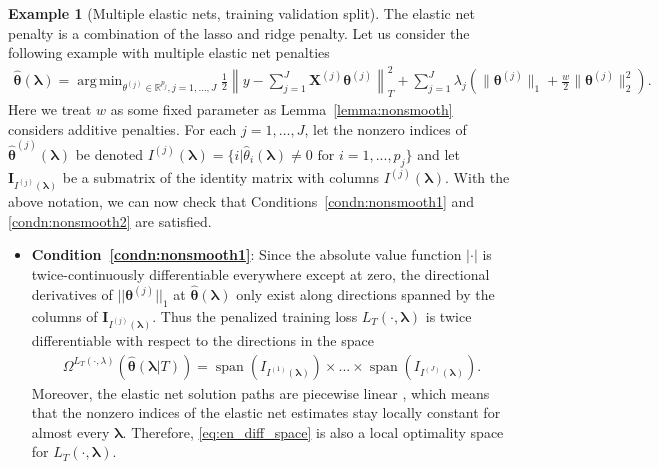 \documentclass[12pt]{article} %
\theoremstyle{definition}
\newtheorem{example}{Example}
\DeclareMathOperator{\spann}{span}
\DeclareMathOperator*{\argmin}{arg\,min}
\begin{document}
\begin{example}[Multiple elastic nets, training validation split]
	\label{ex:elastic_net_tv}
	The elastic net penalty is a combination of the lasso and ridge penalty.
	Let us consider the following example with multiple elastic net penalties
	\begin{align}
	\hat{\boldsymbol{\theta}}(\boldsymbol{\lambda})
	=\argmin_{\theta^{(j)} \in \mathbb{R}^{p_j}, j = 1,...,J}
	\frac{1}{2} \left \| y - \sum_{j=1}^J \boldsymbol{X}^{(j)} \boldsymbol{\theta}^{(j)} \right \|_T^2
	+ \sum_{j=1}^J \lambda_j \left(
	\| \boldsymbol{\theta}^{(j)}\|_1
	+ \frac{w}{2} \| \boldsymbol{\theta}^{(j)}\|_2^2
	\right).
	\label{eq:elastic_net_ex}
	\end{align}
	Here we treat $w$ as some fixed parameter as Lemma~\ref{lemma:nonsmooth} considers additive penalties.
	For each $j = 1,...,J$, let the nonzero indices of $\hat{\boldsymbol{\theta}}^{(j)}(\boldsymbol{\lambda})$ be denoted $I^{(j)}(\boldsymbol\lambda) = \{i | \hat{\theta}_i(\boldsymbol\lambda) \ne 0 \text{ for } i=1,...,p_j \}$ and let $\boldsymbol I_{I^{(j)}(\boldsymbol \lambda)}$ be a submatrix of the identity matrix with columns $I^{(j)}(\boldsymbol\lambda)$.
	With the above notation, we can now check that Conditions~\ref{condn:nonsmooth1} and \ref{condn:nonsmooth2} are satisfied.
	\begin{itemize}
		\item[] \textbf{Condition~\ref{condn:nonsmooth1}}: Since the absolute value function $|\cdot|$ is twice-continuously differentiable everywhere except at zero, the directional derivatives of $||\boldsymbol \theta^{(j)}||_1$ at $\hat{\boldsymbol{\theta}}(\boldsymbol{\lambda})$ only exist along directions spanned by the columns of $\boldsymbol I_{I^{(j)}(\boldsymbol \lambda)}$.
		Thus the penalized training loss $L_T(\cdot, \boldsymbol{\lambda})$ is twice differentiable with respect to the directions in the space
		\begin{align}
		\Omega^{L_T(\cdot, \lambda)}(\hat{\boldsymbol{\theta}}(\boldsymbol{\lambda} | T))
		= \spann(I_{I^{(1)}(\boldsymbol \lambda)}) \times ... \times \spann(I_{I^{(J)}(\boldsymbol \lambda)}).
		\label{eq:en_diff_space}
		\end{align}
		Moreover, the elastic net solution paths are piecewise linear \citep{zou2003regression}, which means that the nonzero indices of the elastic net estimates stay locally constant for almost every $\boldsymbol{\lambda}$. Therefore, \eqref{eq:en_diff_space} is also a local optimality space for $L_T(\cdot, \boldsymbol{\lambda})$.

\end{itemize}
\end{example}
\end{document}
